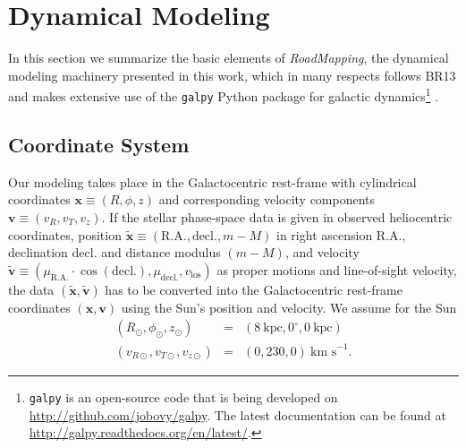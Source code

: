 \documentclass[iop,revtex4,numberedappendix,appendixfloats]{emulateapj}
\newcommand{\vect}[1]{\boldsymbol{#1}}
\newcommand{\RM}{{\sl RoadMapping}}
\begin{document}
\section{Dynamical Modeling}

In this section we summarize the basic elements of \RM{}, the dynamical modeling machinery presented in this work, which in many respects follows BR13 and makes extensive use of the \texttt{galpy} Python package for galactic dynamics\footnote{\texttt{galpy} is an open-source code that is being developed on \url{http://github.com/jobovy/galpy}. The latest documentation can be found at \url{http://galpy.readthedocs.org/en/latest/}.} \citep{2015ApJS..216...29B}.


\subsection{Coordinate System} \label{sec:coordinates}

Our modeling takes place in the Galactocentric rest-frame with cylindrical coordinates $\vect{x} \equiv (R,\phi,z)$ and corresponding velocity components $\vect{v} \equiv (v_R,v_T,v_z)$. If the stellar phase-space data is given in observed heliocentric coordinates, position $\tilde{\vect{x}} \equiv(\text{R.A.},\text{decl.},m-M)$ in right ascension R.A., declination decl. and distance modulus $(m-M)$, and velocity $\tilde{\vect{v}} \equiv (\mu_\text{R.A.} \cdot \cos ( \text{decl.}),\mu_\text{decl.},v_\text{los})$ as proper motions and line-of-sight velocity, the data $(\tilde{\vect{x}},\tilde{\vect{v}})$ has to be converted into the Galactocentric rest-frame coordinates $(\vect{x},\vect{v})$ using the Sun's position and velocity. We assume for the Sun
\begin{eqnarray*}
(R_\odot,\phi_\odot,z_\odot) &=&(8~\text{kpc}, 0^\circ, 0~\text{kpc})\\
(v_{R\odot},v_{T\odot},v_{z\odot}) &=& (0,230,0)~\text{km s}^{-1}.
\end{eqnarray*}

\end{document}
